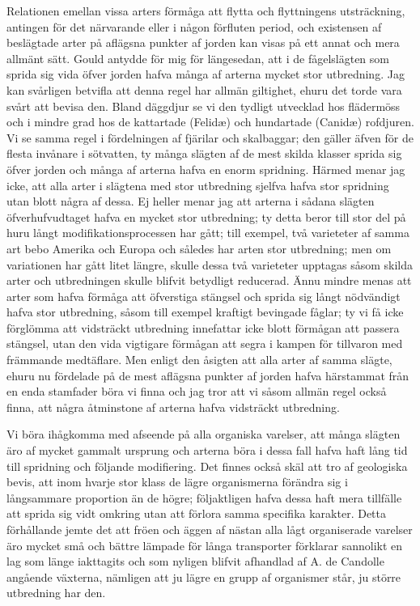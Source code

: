 Relationen emellan vissa arters förmåga att flytta och flyttningens utsträckning, antingen för det närvarande eller i någon förfluten period, och existensen af beslägtade arter på aflägsna punkter af jorden kan visas på ett annat och mera allmänt sätt. Gould antydde för mig för längesedan, att i de fågelslägten som sprida sig vida öfver jorden hafva många af arterna mycket stor utbredning. Jag kan svårligen betvifla att denna regel har allmän giltighet, ehuru det torde vara svårt att bevisa den. Bland däggdjur se vi den tydligt utvecklad hos flädermöss och i mindre grad hos de kattartade (Felidæ) och hundartade (Canidæ) rofdjuren. Vi se samma regel i fördelningen af fjärilar och skalbaggar; den gäller äfven för de flesta invånare i sötvatten, ty många slägten af de mest skilda klasser sprida sig öfver jorden och många af arterna hafva en enorm spridning. Härmed menar jag icke, att alla arter i slägtena med stor utbredning sjelfva hafva stor spridning utan blott några af dessa. Ej heller menar jag att arterna i sådana slägten öfverhufvudtaget hafva en mycket stor utbredning; ty detta beror till stor del på huru långt modifikationsprocessen har gått; till exempel, två varieteter af samma art bebo Amerika och Europa och således har arten stor utbredning; men om variationen har gått litet längre, skulle dessa två varieteter upptagas såsom skilda arter och utbredningen skulle blifvit betydligt reducerad. Ännu mindre menas att arter som hafva förmåga att öfverstiga stängsel och sprida sig långt nödvändigt hafva stor utbredning, såsom till exempel kraftigt bevingade fåglar; ty vi få icke förglömma att vidsträckt utbredning innefattar icke blott förmågan att passera stängsel, utan den vida vigtigare förmågan att segra i kampen för tillvaron med främmande medtäflare. Men enligt den åsigten att alla arter af samma slägte, ehuru nu fördelade på de mest aflägsna punkter af jorden hafva härstammat från en enda stamfader böra vi finna och jag tror att vi såsom allmän regel också finna, att några åtminstone af arterna hafva vidsträckt utbredning.

Vi böra ihågkomma med afseende på alla organiska varelser, att många slägten äro af mycket gammalt ursprung och arterna böra i dessa fall hafva haft lång tid till spridning och följande modifiering. Det finnes också skäl att tro af geologiska bevis, att inom hvarje stor klass de lägre organismerna förändra sig i långsammare proportion än de högre; följaktligen hafva dessa haft mera tillfälle att sprida sig vidt omkring utan att förlora samma specifika karakter. Detta förhållande jemte det att fröen och äggen af nästan alla lågt organiserade varelser äro mycket små och bättre lämpade för långa transporter förklarar sannolikt en lag som länge iakttagits och som nyligen blifvit afhandlad af A. de Candolle angående växterna, nämligen att ju lägre en grupp af organismer står, ju större utbredning har den.

